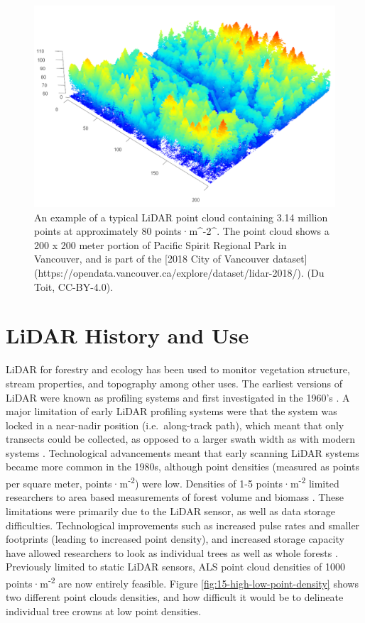 \documentclass[
]{book}
\begin{document}
\begin{figure}
\includegraphics[width=0.8\linewidth]{images/15-las-denoise} \caption{An example of a typical LiDAR point cloud containing 3.14 million points at approximately 80 points·m^-2^. The point cloud shows a 200 x 200 meter portion of Pacific Spirit Regional Park in Vancouver, and is part of the [2018 City of Vancouver dataset] (https://opendata.vancouver.ca/explore/dataset/lidar-2018/). (Du Toit, CC-BY-4.0).}\label{fig:15-las-denoise}
\end{figure}

\hypertarget{lidar-history-and-use}{%
\section{LiDAR History and Use}\label{lidar-history-and-use}}

LiDAR for forestry and ecology has been used to monitor vegetation structure, stream properties, and topography among other uses. The earliest versions of LiDAR were known as profiling systems and first investigated in the 1960's \citep{nelson_how_2013}. A major limitation of early LiDAR profiling systems were that the system was locked in a near-nadir position (i.e.~along-track path), which meant that only transects could be collected, as opposed to a larger swath width as with modern systems \citep{nelson_how_2013, lim_lidar_2003}. Technological advancements meant that early scanning LiDAR systems became more common in the 1980s, although point densities (measured as points per square meter, points·m\textsuperscript{-2}) were low. Densities of 1-5 points·m\textsuperscript{-2} limited researchers to area based measurements of forest volume and biomass \citep{nelson_how_2013}. These limitations were primarily due to the LiDAR sensor, as well as data storage difficulties. Technological improvements such as increased pulse rates and smaller footprints (leading to increased point density), and increased storage capacity have allowed researchers to look as individual trees as well as whole forests \citep{jakubowski_delineating_2013}. Previously limited to static LiDAR sensors, ALS point cloud densities of 1000 points·m\textsuperscript{-2} are now entirely feasible. Figure \ref{fig:15-high-low-point-density} shows two different point clouds densities, and how difficult it would be to delineate individual tree crowns at low point densities.
\end{document}
